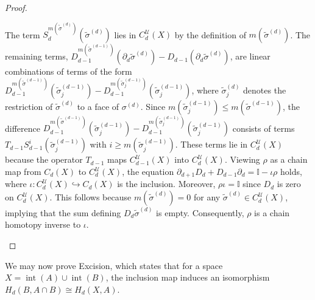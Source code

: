 \begin{proof}{\textit{\cite[Proof of Proposition 2.21]{hatcher2005algebraic}}}
\begin{enumerate}
	The term \( S_d^{m(\tilde{\sigma}^{(d)})}(\tilde{\sigma}^{(d)}) \) lies in \( C_d^{\mathcal{U}}(X) \) by the definition of \( m(\tilde{\sigma}^{(d)}) \). The remaining terms, \( D_{d-1}^{m(\tilde{\sigma}^{(d-1)})}(\partial_d \tilde{\sigma}^{(d)}) - D_{d-1}(\partial_d \tilde{\sigma}^{(d)}) \), are linear combinations of terms of the form \( D_{d-1}^{m(\tilde{\sigma}^{(d-1)})}(\tilde{\sigma}^{(d-1)}_j) - D_{d-1}^{m(\tilde{\sigma}^{(d-1)}_j)}(\tilde{\sigma}^{(d-1)}_j) \), where \( \tilde{\sigma}^{(d)}_j \) denotes the restriction of \( \tilde{\sigma}^{(d)} \) to a face of \( \sigma^{(d)} \). Since \( m(\tilde{\sigma}^{(d-1)}_j) \leq m(\tilde{\sigma}^{(d-1)}) \), the difference \( D^{m(\tilde{\sigma}^{(d-1)})}_{d-1}(\tilde{\sigma}^{(d-1)}_j) - D_{d-1}^{m(\tilde{\sigma}^{(d-1)}_j)}(\tilde{\sigma}^{(d-1)}_j) \) consists of terms \( T_{d-1} S^i_{d-1}(\tilde{\sigma}^{(d-1)}_j) \) with \( i \geq m(\tilde{\sigma}^{(d-1)}_j) \). These terms lie in \( C_d^{\mathcal{U}}(X) \) because the operator \( T_{d-1} \) maps \( C_{d-1}^{\mathcal{U}}(X) \) into \( C_d^{\mathcal{U}}(X) \). Viewing \( \rho \) as a chain map from \( C_d(X) \) to \( C_d^{\mathcal{U}}(X) \), the equation $\partial_{d+1} D_{d} + D_{d-1} \partial_{d} = \mathbb{I} - \iota \rho$ holds, where \( \iota : C_d^{\mathcal{U}}(X) \hookrightarrow C_d(X) \) is the inclusion. Moreover, \( \rho \iota = \mathbb{I} \) since \( D_d \) is zero on \( C_d^{\mathcal{U}}(X) \). This follows because \( m(\tilde{\sigma}^{(d)}) = 0 \) for any \( \tilde{\sigma}^{(d)} \in C_d^{\mathcal{U}}(X) \), implying that the sum defining \( D_d\tilde{\sigma}^{(d)} \) is empty. Consequently, \( \rho \) is a chain homotopy inverse to \( \iota \).
\end{enumerate}
\end{proof}

We may now prove Excision, which states that for a space \( X = \operatorname{int}(A) \cup \operatorname{int}(B) \), the inclusion map induces an isomorphism \( H_d(B, A \cap B) \cong H_d(X, A) \).

